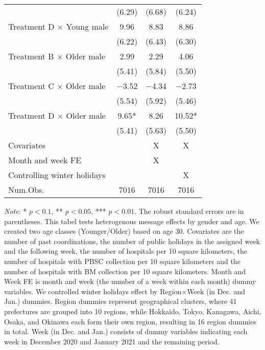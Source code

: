 \documentclass[12pt, a4paper]{article}
\begin{document}
\begin{table}[H]
\begin{threeparttable}
\begin{tabular}[t]{lccc}
 & (\num{6.29}) & (\num{6.68}) & (\num{6.24})\\
Treatment D $\times$ Young male & \num{9.96} & \num{8.83} & \num{8.86}\\
 & (\num{6.22}) & (\num{6.43}) & (\num{6.30})\\
Treatment B $\times$ Older male & \num{2.99} & \num{2.29} & \num{4.06}\\
 & (\num{5.41}) & (\num{5.84}) & (\num{5.50})\\
Treatment C $\times$ Older male & \num{-3.52} & \num{-4.34} & \num{-2.73}\\
 & (\num{5.54}) & (\num{5.92}) & (\num{5.46})\\
Treatment D $\times$ Older male & \num{9.65}* & \num{8.26} & \num{10.52}*\\
 & (\num{5.41}) & (\num{5.63}) & (\num{5.50})\\
\midrule
Covariates &  & X & X\\
Month and week FE &  & X & \\
Controlling winter holidays &  &  & X\\
Num.Obs. & \num{7016} & \num{7016} & \num{7016}\\
\bottomrule
\end{tabular}
\begin{tablenotes}
\item \emph{Note}: * $p < 0.1$, ** $p < 0.05$, *** $p < 0.01$. The robust standard errors are in parentheses. This tabel tests heterogenous message effects by gender and age. We created two age classes (Younger/Older) based on age 30. Covariates are the number of past coordinations, the number of public holidays in the assigned week and the following week, the number of hospitals per 10 square kilometers, the number of hospitals with PBSC collection per 10 square kilometers and the number of hospitals with BM collection per 10 square kilometers. Month and Week FE is month and week (the number of a week within each month) dummy variables. We controlled winter holidays effect by Region$\times$Week (in Dec. and Jan.) dummies. Region dummies represent geographical clusters, where 41 prefectures are grouped into 10 regions, while Hokkaido, Tokyo, Kanagawa, Aichi, Osaka, and Okinawa each form their own region, resulting in 16 region dummies in total. Week (in Dec. and Jan.) consists of dummy variables indicating each week in December 2020 and January 2021 and the remaining period.
\end{tablenotes}
\end{threeparttable}
\end{table}
\end{document}
